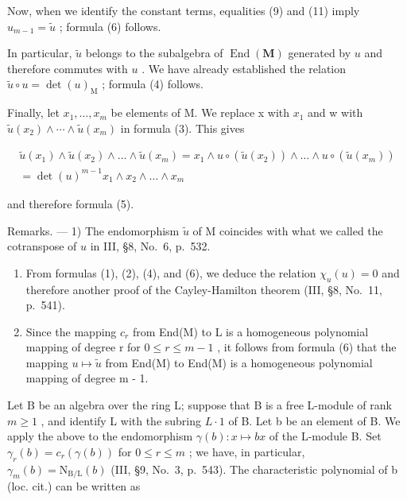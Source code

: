 Now, when we identify the constant terms, equalities (9) and (11) imply \(u_{m-1} = \widetilde{u}\) ; formula (6) follows.

In particular, \(\widetilde{u}\) belongs to the subalgebra of \(\operatorname{End}(\mathbf{M})\) generated by \(u\) and therefore commutes with \(u\) . We have already established the relation \(\widetilde{u} \circ u = \det(u)_{\mathrm{M}}\) ; formula (4) follows.

Finally, let \(x_{1},\ldots,x_{m}\) be elements of M. We replace x with \(x_{1}\) and w with \(\widetilde{u}(x_{2})\wedge\cdots\wedge\widetilde{u}(x_{m})\) in formula (3). This gives

\[
\begin{array}{c} \widetilde {u} (x _ {1}) \wedge \widetilde {u} (x _ {2}) \wedge \dots \wedge \widetilde {u} (x _ {m}) = x _ {1} \wedge u \circ (\widetilde {u} (x _ {2})) \wedge \dots \wedge u \circ (\widetilde {u} (x _ {m})) \\ = \det (u) ^ {m - 1} x _ {1} \wedge x _ {2} \wedge \dots \wedge x _ {m} \end{array}
\]

and therefore formula (5).

Remarks. --- 1) The endomorphism \(\widetilde{u}\) of M coincides with what we called the cotranspose of \(u\) in III, §8, No.~6, p.~532.

\begin{enumerate}
\def\labelenumi{\arabic{enumi})}
\setcounter{enumi}{1}
\item
  From formulas (1), (2), (4), and (6), we deduce the relation \(\chi_u(u) = 0\) and therefore another proof of the Cayley-Hamilton theorem (III, §8, No.~11, p.~541).
\item
  Since the mapping \(c_{r}\) from End(M) to L is a homogeneous polynomial mapping of degree r for \(0 \leqslant r \leqslant m - 1\) , it follows from formula (6) that the mapping \(u \mapsto \widetilde{u}\) from End(M) to End(M) is a homogeneous polynomial mapping of degree m - 1.
\end{enumerate}

Let B be an algebra over the ring L; suppose that B is a free L-module of rank \(m \geqslant 1\) , and identify L with the subring \(L \cdot 1\) of B. Let b be an element of B. We apply the above to the endomorphism \(\gamma(b) : x \mapsto bx\) of the L-module B. Set \(\gamma_{r}(b) = c_{r}(\gamma(b))\) for \(0 \leqslant r \leqslant m\) ; we have, in particular, \(\gamma_{m}(b) = \mathrm{N}_{\mathrm{B/L}}(b)\) (III, §9, No.~3, p.~543). The characteristic polynomial of b (loc. cit.) can be written as

